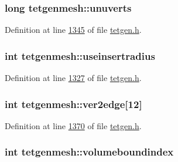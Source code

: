 \subsubsection[{\texorpdfstring{unuverts}{unuverts}}]{\setlength{\rightskip}{0pt plus 5cm}long tetgenmesh\+::unuverts}\hypertarget{classtetgenmesh_a6207ea4c664732d18df4e1cb969f46f2}{}\label{classtetgenmesh_a6207ea4c664732d18df4e1cb969f46f2}


Definition at line \hyperlink{tetgen_8h_source_l01345}{1345} of file \hyperlink{tetgen_8h_source}{tetgen.\+h}.

\subsubsection[{\texorpdfstring{useinsertradius}{useinsertradius}}]{\setlength{\rightskip}{0pt plus 5cm}int tetgenmesh\+::useinsertradius}\hypertarget{classtetgenmesh_a45386c7a807521fadc994a0be99df405}{}\label{classtetgenmesh_a45386c7a807521fadc994a0be99df405}


Definition at line \hyperlink{tetgen_8h_source_l01327}{1327} of file \hyperlink{tetgen_8h_source}{tetgen.\+h}.

\subsubsection[{\texorpdfstring{ver2edge}{ver2edge}}]{\setlength{\rightskip}{0pt plus 5cm}int tetgenmesh\+::ver2edge\mbox{[}12\mbox{]}\hspace{0.3cm}{\ttfamily [static]}}\hypertarget{classtetgenmesh_a7a38e9d17ce50ec564eb72a8919b3279}{}\label{classtetgenmesh_a7a38e9d17ce50ec564eb72a8919b3279}


Definition at line \hyperlink{tetgen_8h_source_l01370}{1370} of file \hyperlink{tetgen_8h_source}{tetgen.\+h}.

\subsubsection[{\texorpdfstring{volumeboundindex}{volumeboundindex}}]{\setlength{\rightskip}{0pt plus 5cm}int tetgenmesh\+::volumeboundindex}\hypertarget{classtetgenmesh_afbc49fd2c3c19c8725ea89348440e58b}{}\label{classtetgenmesh_afbc49fd2c3c19c8725ea89348440e58b}


